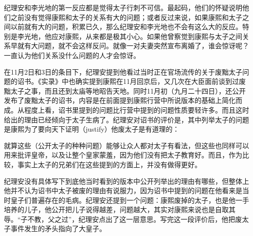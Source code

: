 
纪理安和李光地的第一反应都是觉得太子行刺不可信。最起码，他们的怀疑说明他们之前没有觉得康熙和太子的关系有大的问题；或者反过来说，如果康熙和太子之间以前就有大的问题，积累已久，那么纪理安和李光地也不会有这么大的反应。特别是李光地，他应对康熙，从来都是极其小心。如果他曾察觉到康熙与太子之间关系早就有大问题，就不会这样反问。就像一对夫妻突然宣布离婚了，谁会惊讶呢？一直认为他们关系没什么问题的人才会惊讶。



在11月2日和3日的条目下，纪理安提到他看过当时正在官场流传的关于废黜太子问题的诏书。《实录》中也确实提到康熙在11月回京后，又几次在大臣面前谈到过废黜太子之事，而且还到太庙等地昭告天地。同时11月初（九月二十四日），还公开发布了废黜太子的诏书，内容是在前面提到康熙行营中所说版本的基础上简化而成。从程度上看，诏书里提到的问题比行营中提到的问题性质要轻许多。而且这时给出的理由已经倾向于太子生病了。纪理安对诏书的评价是，其中列举太子的问题是康熙为了要向天下证明（justify）他废太子是有道理的：



\begin{bookquote}就算这些（公开太子的种种问题）能够让众人都对太子有看法，但这些也同样可以用来批评皇帝，以及让整个皇家蒙羞，因为他们没有把太子教育好。而且，作为比较，事实上太子的兄弟们在这些提到的方面上，并没有做得更好。\end{bookquote}


纪理安没有具体写下到底他当时看到的版本中公开列举出的理由有哪些，但整体上他并不认为诏书中太子被废的理由有说服力，因为诏书中提到的问题在他看来是当时皇子们普遍存在的毛病。纪理安还提到一个问题：康熙废掉的太子，也是他一手培养的儿子，他公开把儿子说得越差，问题越大，其实对康熙来说也是自取其辱。“子不教，父之过”，纪理安点出了这一层意思。写完这一段评价后，他把废太子事件发生的矛头指向了大皇子。


